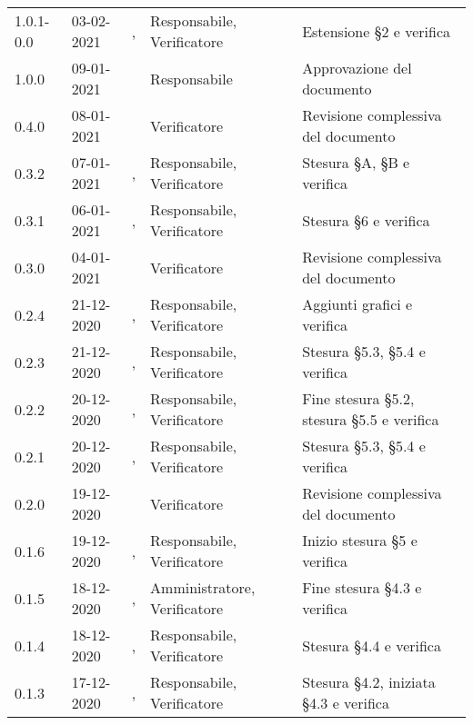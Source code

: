 {{\begin{longtable}{C{1.7cm} C{2.5cm} C{3.2cm} C{2.7cm} C{4.8cm}}
1.0.1-0.0 & 03-02-2021 & \PA{}, \SP{} & Responsabile, Verificatore & Estensione \S 2 e verifica\\

1.0.0 & 09-01-2021 & \SG{} & Responsabile & Approvazione del documento \\

0.4.0 & 08-01-2021 & \ZM{} & Verificatore & Revisione complessiva del documento \\

0.3.2 & 07-01-2021 & \BM{}, \ZM{} & Responsabile, Verificatore & Stesura \S A, \S B e verifica \\

0.3.1 & 06-01-2021 & \BM{}, \SH{} & Responsabile, Verificatore & Stesura \S 6 e verifica\\

0.3.0 & 04-01-2021 & \SH{} & Verificatore & Revisione complessiva del documento \\

0.2.4 & 21-12-2020 & \SG{}, \SH{} & Responsabile, Verificatore & Aggiunti grafici  e verifica\\

0.2.3 & 21-12-2020 & \BM{}, \ZM{} & Responsabile, Verificatore & Stesura \S 5.3, \S 5.4 e verifica\\

0.2.2 & 20-12-2020 & \SG{}, \ZM{} & Responsabile, Verificatore & Fine stesura \S 5.2, stesura \S 5.5  e verifica\\

0.2.1 & 20-12-2020 & \BM{}, \ZM{} & Responsabile, Verificatore & Stesura \S 5.3, \S 5.4 e verifica\\

0.2.0 & 19-12-2020 & \ZM{} & Verificatore & Revisione complessiva del documento \\

0.1.6 & 19-12-2020 & \SG{}, \SH{} & Responsabile, Verificatore & Inizio stesura \S 5 e verifica\\

0.1.5 & 18-12-2020 & \PA{}, \SH{} & Amministratore, Verificatore & Fine stesura \S 4.3 e verifica\\

0.1.4 & 18-12-2020 & \SG{}, \ZM{} & Responsabile, Verificatore & Stesura \S 4.4 e verifica \\

0.1.3 & 17-12-2020 & \BM{}, \ZM{} & Responsabile, Verificatore & Stesura \S 4.2, iniziata \S 4.3 e verifica \\


\end{longtable}}}
